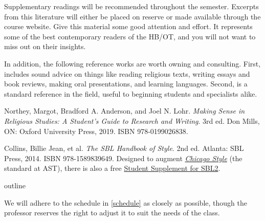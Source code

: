 \documentclass[titlepage]{article}
\begin{document}
Supplementary readings will be recommended throughout the semester.
Excerpts from this literature will either be placed on reserve or made
available through the course website. Give this material some good
attention and effort. It represents some of the best contemporary
readers of the HB/OT, and you will not want to miss out on their
insights.

In addition, the following reference works are worth owning and
consulting. First, \cite{rlgs} includes sound advice on things like
reading religious texts, writing essays and book reviews, making oral
presentations, and learning languages. Second, \cite{sbl2} is a standard
reference in the field, useful to beginning students and specialists
alike.

\begingroup
\renewcommand{\section}[2]{}%
\begin{thebibliography}{Making Sense}%

	 Northey, Margot, Bradford A. Anderson, and Joel N. Lohr.
	\emph{Making Sense in Religious Studies: A Student's Guide to Research and Writing}.
	3rd ed. Don Mills, ON: Oxford University Press, 2019. ISBN 978-0199026838.

	 Collins, Billie Jean, et al.
	\emph{The SBL Handbook of Style}.
	2nd ed. Atlanta: SBL Press, 2014. ISBN 978-1589839649.
	Designed to augment \href{http://www.chicagomanualofstyle.org/home.html}{\emph{Chicago Style}}
	(the standard at AST), there is also a free
	\href{https://www.sbl-site.org/assets/pdfs/pubs/SBLHSsupp2015-02.pdf}{Student Supplement for SBL2}.

\end{thebibliography}
\endgroup



\section{Course Outline}
\label{outline}

We will adhere to the schedule in \autoref{schedule} as closely as
possible, though the professor reserves the right to adjust it to suit
the needs of the class.

\newcommand\HBFB[1]{\cite[#1]{hbfb}}
\end{document}
